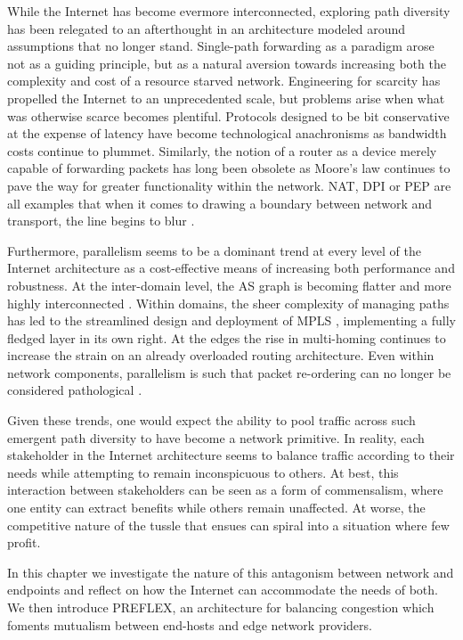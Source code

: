 While the Internet has become evermore interconnected, exploring path diversity has been relegated to an afterthought in an architecture modeled around assumptions that no longer stand. 
Single-path forwarding as a paradigm arose not as a guiding principle, but as a natural aversion towards increasing both the complexity and cost of a resource starved network.
Engineering for scarcity has propelled the Internet to an unprecedented scale, but problems arise when what was otherwise scarce becomes plentiful. 
Protocols designed to be bit conservative at the expense of latency have become technological anachronisms as bandwidth costs continue to plummet. 
Similarly, the notion of a router as a device merely capable of forwarding packets has long been obsolete as Moore's law continues to pave the way for greater functionality within the network. 
\ac{NAT}, \ac{DPI} or \ac{PEP} are all examples that when it comes to drawing a boundary between network and transport, the line begins to blur \cite{Ford:2008p34}.

Furthermore, parallelism seems to be a dominant trend at every level of the Internet architecture as a cost-effective means of increasing both performance and robustness. 
At the inter-domain level, the \ac{AS} graph is becoming flatter and more highly interconnected \cite{Haddadi:2010p129}. 
Within domains, the sheer complexity of managing paths has led to the streamlined design and deployment of \ac{MPLS} \cite{Rosen:2001p147}, implementing a fully fledged layer in its own right. 
At the edges the rise in multi-homing continues to increase the strain on an already overloaded routing architecture. 
Even within network components, parallelism is such that packet re-ordering can no longer be considered pathological \cite{Bennett:1999p120}.

Given these trends, one would expect the ability to pool traffic across such emergent path diversity to have become a network primitive. 
In reality, each stakeholder in the Internet architecture seems to balance traffic according to their needs while attempting to remain inconspicuous to others. 
At best, this interaction between stakeholders can be seen as a form of commensalism, where one entity can extract benefits while others remain unaffected. 
At worse, the competitive nature of the tussle \cite{Clark:2005p67} that ensues can spiral into a situation where few profit.

In this chapter we investigate the nature of this antagonism between network and endpoints and reflect on how the Internet can accommodate the needs of both. We then introduce \ac{PREFLEX}, an architecture for balancing congestion which foments mutualism between end-hosts and edge network providers.

